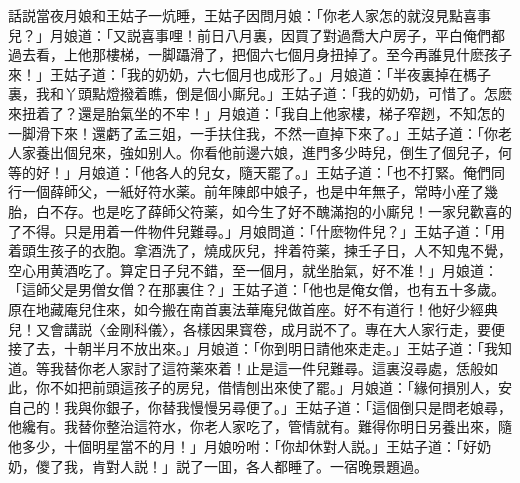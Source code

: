 話説當夜月娘和王姑子一炕睡，王姑子因問月娘：「你老人家怎的就沒見點喜事兒？」月娘道：「又説喜事哩！前日八月裏，因買了對過喬大户房子，平白俺們都過去看，上他那樓梯，一脚躡滑了，把個六七個月身扭掉了。至今再誰見什麽孩子來！」王姑子道：「我的奶奶，六七個月也成形了。」月娘道：「半夜裏掉在榪子裏，我和丫頭點燈撥着瞧，倒是個小廝兒。」王姑子道：「我的奶奶，可惜了。怎麽來扭着了？還是胎氣坐的不牢！」月娘道：「我自上他家樓，梯子窄趔，不知怎的一脚滑下來！還虧了孟三姐，一手扶住我，不然一直掉下來了。」王姑子道：「你老人家養出個兒來，強如别人。你看他前邊六娘，進門多少時兒，倒生了個兒子，何等的好！」月娘道：「他各人的兒女，隨天罷了。」王姑子道：「也不打緊。俺們同行一個薛師父，一紙好符水薬。前年陳郎中娘子，也是中年無子，常時小産了幾胎，白不存。也是吃了薛師父符薬，如今生了好不醜滿抱的小廝兒！一家兒歡喜的了不得。只是用着一件物件兒難尋。」月娘問道：「什麽物件兒？」王姑子道：「用着頭生孩子的衣胞。拿酒洗了，燒成灰兒，拌着符薬，揀壬子日，人不知鬼不覺，空心用黄酒吃了。算定日子兒不錯，至一個月，就坐胎氣，好不准！」月娘道：「這師父是男僧女僧？在那裏住？」王姑子道：「他也是俺女僧，也有五十多歲。原在地藏庵兒住來，如今搬在南首裏法華庵兒做首座。好不有道行！他好少經典兒！又會講説〈金剛科儀〉，各樣因果寳卷，成月説不了。專在大人家行走，要便接了去，十朝半月不放出來。」月娘道：「你到明日請他來走走。」王姑子道：「我知道。等我替你老人家討了這符薬來着！止是這一件兒難尋。這裏沒尋處，恁般如此，你不如把前頭這孩子的房兒，借情刨出來使了罷。」月娘道：「緣何損別人，安自己的！我與你銀子，你替我慢慢另尋便了。」王姑子道：「這個倒只是問老娘尋，他纔有。我替你整治這符水，你老人家吃了，管情就有。難得你明日另養出來，隨他多少，十個明星當不的月！」月娘吩咐：「你却休對人説。」王姑子道：「好奶奶，儍了我，肯對人説！」説了一囬，各人都睡了。一宿晚景題過。

